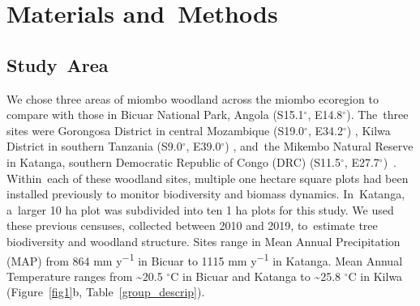 \documentclass[diversity,article,accept,moreauthors,pdftex]{Definitions/mdpi}
\begin{document}
\section{Materials and~Methods}
\unskip
\subsection{Study~Area}

We chose three areas of miombo woodland across the miombo ecoregion to compare with those in Bicuar National Park, Angola (S15.1$^\circ$, E14.8$^\circ$). The~three sites were Gorongosa District in central Mozambique (S19.0$^\circ$, E34.2$^\circ$) \citep{Ryan2011}, Kilwa District in southern Tanzania (S9.0$^\circ$, E39.0$^\circ$) \citep{McNicol2018}, and~the Mikembo Natural Reserve in Katanga, southern Democratic Republic of Congo (DRC) (S11.5$^\circ$, E27.7$^\circ$)~\citep{Muledi2017}. Within~each of these woodland sites, multiple one hectare square plots had been installed previously to monitor biodiversity and biomass dynamics. In~Katanga, a~larger 10 ha plot was subdivided into ten 1 ha plots for this study. We used these previous censuses, collected between 2010 and 2019, to~estimate tree biodiversity and woodland structure. Sites range in Mean Annual Precipitation (MAP) from 864 mm y\textsuperscript{$-$1} in Bicuar to 1115 mm y\textsuperscript{$-$1} in Katanga. Mean Annual Temperature ranges from \textasciitilde{}20.5 $^\circ$C in Bicuar and Katanga to \textasciitilde{}25.8 $^\circ$C in Kilwa (Figure~\ref{fig1}b, Table~\ref{group_descrip}).
\end{document}
